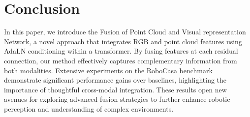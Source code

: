 \section{Conclusion}
\label{sec:conclusion}
In this paper, we introduce the Fusion of Point Cloud and Visual representation Network, a novel approach that integrates RGB and point cloud features using AdaLN conditioning within a transformer. By fusing features at each residual connection, our method effectively captures complementary information from both modalities. Extensive experiments on the RoboCasa benchmark demonstrate significant performance gains over baselines, highlighting the importance of thoughtful cross-modal integration. These results open new avenues for exploring advanced fusion strategies to further enhance robotic perception and understanding of complex environments.



